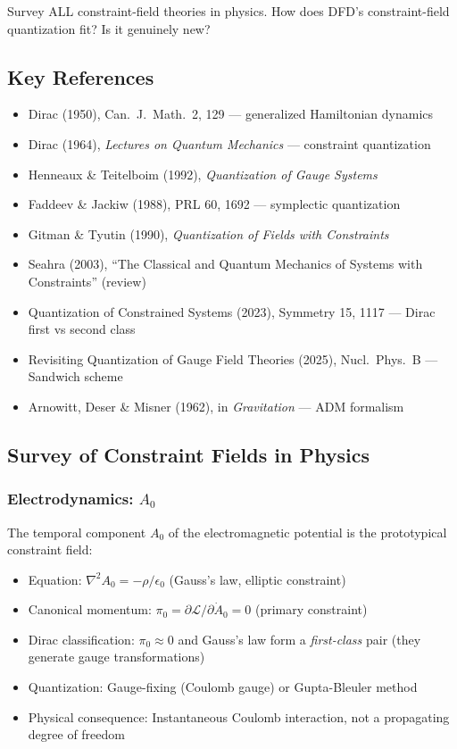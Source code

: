 \documentclass[11pt,a4paper]{article}
\begin{document}
Survey ALL constraint-field theories in physics. How does DFD's constraint-field quantization fit? Is it genuinely new?

\subsection{Key References}

\begin{itemize}
\item Dirac (1950), Can.\ J.\ Math.\ 2, 129 --- generalized Hamiltonian dynamics
\item Dirac (1964), \emph{Lectures on Quantum Mechanics} --- constraint quantization
\item Henneaux \& Teitelboim (1992), \emph{Quantization of Gauge Systems}
\item Faddeev \& Jackiw (1988), PRL 60, 1692 --- symplectic quantization
\item Gitman \& Tyutin (1990), \emph{Quantization of Fields with Constraints}
\item Seahra (2003), ``The Classical and Quantum Mechanics of Systems with Constraints'' (review)
\item Quantization of Constrained Systems (2023), Symmetry 15, 1117 --- Dirac first vs second class
\item Revisiting Quantization of Gauge Field Theories (2025), Nucl.\ Phys.\ B --- Sandwich scheme
\item Arnowitt, Deser \& Misner (1962), in \emph{Gravitation} --- ADM formalism
\end{itemize}

\subsection{Survey of Constraint Fields in Physics}

\subsubsection{Electrodynamics: $A_0$}

The temporal component $A_0$ of the electromagnetic potential is the prototypical constraint field:
\begin{itemize}
\item Equation: $\nabla^2 A_0 = -\rho/\epsilon_0$ (Gauss's law, elliptic constraint)
\item Canonical momentum: $\pi_0 = \partial\mathcal{L}/\partial\dot{A}_0 = 0$ (primary constraint)
\item Dirac classification: $\pi_0 \approx 0$ and Gauss's law form a \emph{first-class} pair (they generate gauge transformations)
\item Quantization: Gauge-fixing (Coulomb gauge) or Gupta-Bleuler method
\item Physical consequence: Instantaneous Coulomb interaction, not a propagating degree of freedom
\end{itemize}
\end{document}
